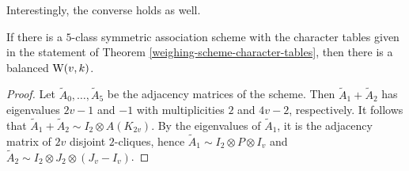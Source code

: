 \documentclass[../../../main]{subfiles}
\begin{document}
Interestingly, the converse holds as well.

\begin{thm}\label{bw-from-scheme-theorem}
 If there is a $5$-class symmetric association scheme with the character tables given in the statement of Theorem \ref{weighing-scheme-character-tables}, then there is a balanced $\text{W}(v,k)$.
\end{thm}

\begin{proof}
 Let $\tilde A_0, \dots, \tilde A_5$ be the adjacency matrices of the scheme. Then $\tilde A_1 + \tilde A_2$ has eigenvalues $2v-1$ and $-1$ with multiplicities $2$ and $4v-2$, respectively. It follows that $\tilde A_1 + \tilde A_2 \sim I_2 \otimes A(K_{2v})$. By the eigenvalues of $\tilde A_1$, it is the adjacency matrix of $2v$ disjoint $2$-cliques, hence $\tilde A_1 \sim I_2 \otimes P \otimes I_v$ and $\tilde A_2 \sim I_2 \otimes J_2 \otimes (J_v-I_v)$.
 

\end{proof}
\end{document}
